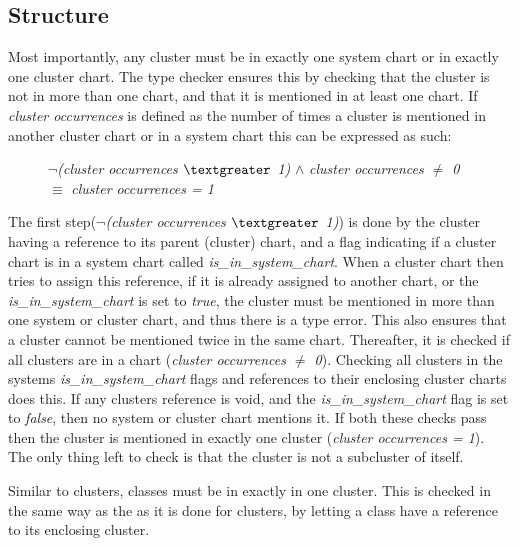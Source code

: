 \subsection{Structure}
\label{implementation-informal-structure}
Most importantly, any cluster must be in exactly one system chart or in exactly one cluster chart. The type checker ensures this by checking that the cluster is not in more than one chart, and that it is mentioned in at least one chart. If \textit{cluster occurrences} is defined as the number of times a cluster is mentioned in another cluster chart or in a system chart this can be expressed as such: 
\begin{figure}[H]
{\footnotesize\begin{center} $\neg$\textit{(cluster occurrences $\textgreater$ 1)} $\wedge$ \textit{cluster occurrences $\neq$ 0} \textit{} $\equiv$  \textit{cluster occurrences = 1}
\end{center}}
\end{figure}
The first step({\footnotesize$\neg$\textit{(cluster occurrences $\textgreater$ 1)}}) is done by the cluster having a reference to its parent (cluster) chart, and a flag indicating if a cluster chart is in a system chart called \textit{is\_in\_system\_chart}. When a cluster chart then tries to assign this reference, if it is already assigned to another chart, or the \textit{is\_in\_system\_chart} is set to \textit{true}, the cluster must be mentioned in more than one system or cluster chart, and thus there is a type error. This also ensures that a cluster cannot be mentioned twice in the same chart. Thereafter, it is checked if all clusters are in a chart ({\footnotesize\textit{cluster occurrences $\neq$ 0}}). Checking all clusters in the systems \textit{is\_in\_system\_chart} flags and references to their enclosing cluster charts does this. If any clusters reference is void, and the \textit{is\_in\_system\_chart} flag is set to \textit{false}, then no system or cluster chart mentions it. If both these checks pass then the cluster is mentioned in exactly one cluster ({\footnotesize\textit{cluster occurrences = 1}}). The only thing left to check is that the cluster is not a subcluster of itself.

Similar to clusters, classes must be in exactly in one cluster. This is checked in the same way as the as it is done for clusters, by letting a class have a reference to its enclosing cluster.
